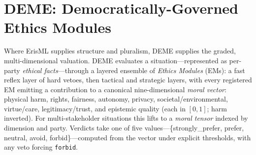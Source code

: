 \section{DEME: Democratically-Governed Ethics Modules}
\label{sec:deme}

Where ErisML supplies structure and pluralism, DEME supplies the graded, multi-dimensional
valuation. DEME evaluates a situation---represented as per-party \emph{ethical
facts}---through a layered ensemble of \emph{Ethics Modules} (EMs): a fast reflex layer of
hard vetoes, then tactical and strategic layers, with every registered EM emitting a
contribution to a canonical nine-dimensional \emph{moral vector}: physical harm, rights,
fairness, autonomy, privacy, societal/environmental, virtue/care, legitimacy/trust, and
epistemic quality (each in $[0,1]$; harm inverted). For multi-stakeholder situations this
lifts to a \emph{moral tensor} indexed by dimension and party. Verdicts take one of five
values---\{strongly\_prefer, prefer, neutral, avoid, forbid\}---computed from the vector
under explicit thresholds, with any veto forcing \texttt{forbid}.

